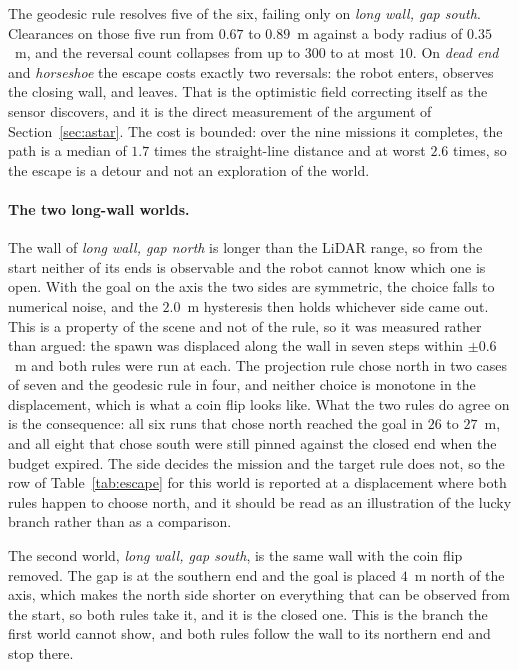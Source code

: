 \documentclass[11pt,a4paper]{article}
\begin{document}
The geodesic rule resolves five of the six, failing only on \emph{long wall, gap south}. Clearances on those
five run from $0.67$ to $0.89$~m against a body radius of $0.35$~m, and the reversal count collapses from up
to $300$ to at most $10$. On \emph{dead end} and \emph{horseshoe} the escape costs exactly two
reversals: the robot enters, observes the closing wall, and leaves. That is the optimistic field correcting
itself as the sensor discovers, and it is the direct measurement of the argument of Section~\ref{sec:astar}.
The cost is bounded: over the nine missions it completes, the path is a median of $1.7$ times the
straight-line distance and at worst $2.6$ times, so the escape is a detour and not an exploration of the
world.

\paragraph{The two long-wall worlds.} The wall of
\emph{long wall, gap north} is longer than the LiDAR range, so from the start neither of its ends is observable and
the robot cannot know which one is open. With the goal on the axis the two sides are symmetric, the choice
falls to numerical noise, and the $2.0$~m hysteresis then holds whichever side came out. This is a property
of the scene and not of the rule, so it was measured rather than argued: the spawn was displaced along the
wall in seven steps within $\pm0.6$~m and both rules were run at each. The projection rule chose north in
two cases of seven and the geodesic rule in four, and neither choice is monotone in the displacement, which
is what a coin flip looks like. What the two rules do agree on is the consequence: all six runs that chose
north reached the goal in $26$ to $27$~m, and all eight that chose south were still pinned against the
closed end when the budget expired. The side decides the mission and the target rule does not, so the row of
Table~\ref{tab:escape} for this world is reported at a displacement where both rules happen to choose north,
and it should be read as an illustration of the lucky branch rather than as a comparison.

The second world, \emph{long wall, gap south}, is the same wall with the coin flip removed. The gap is at the southern end and
the goal is placed $4$~m north of the axis, which makes the north side shorter on everything that can be
observed from the start, so both rules take it, and it is the closed one. This is the branch the first world
cannot show, and both rules follow the wall to its northern end and stop there.
\end{document}
